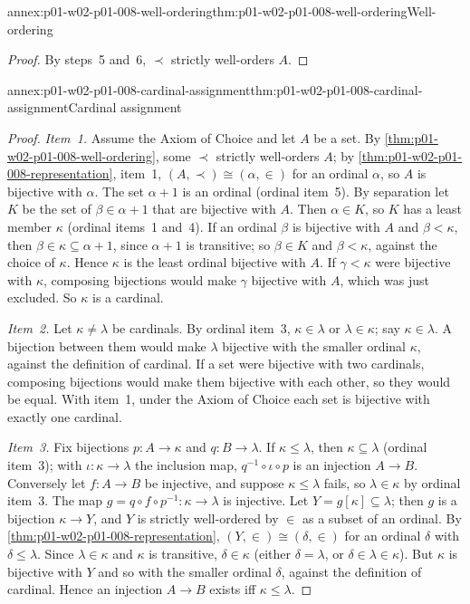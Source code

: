 \begin{annexitem}{annex:p01-w02-p01-008-well-ordering}{thm:p01-w02-p01-008-well-ordering}{Well-ordering}
\begin{proof}
By steps~5 and~6, \(\prec\) strictly well-orders \(A\).
\end{proof}
\end{annexitem}

\begin{annexitem}{annex:p01-w02-p01-008-cardinal-assignment}{thm:p01-w02-p01-008-cardinal-assignment}{Cardinal assignment}
\begin{proof}
\emph{Item~1.} Assume the Axiom of Choice and let \(A\) be a set. By
\cref{thm:p01-w02-p01-008-well-ordering}, some \(\prec\) strictly
well-orders \(A\); by \cref{thm:p01-w02-p01-008-representation}, item~1,
\((A,\prec)\cong(\alpha,\in)\) for an ordinal \(\alpha\), so \(A\) is
bijective with \(\alpha\). The set \(\alpha+1\) is an ordinal (ordinal
item~5). By separation let \(K\) be the set of \(\beta\in\alpha+1\) that are
bijective with \(A\). Then \(\alpha\in K\), so \(K\) has a least member
\(\kappa\) (ordinal items~1 and~4). If an ordinal \(\beta\) is bijective
with \(A\) and \(\beta<\kappa\), then \(\beta\in\kappa\subseteq\alpha+1\),
since \(\alpha+1\) is transitive; so \(\beta\in K\) and \(\beta<\kappa\),
against the choice of \(\kappa\). Hence \(\kappa\) is the least ordinal
bijective with \(A\). If \(\gamma<\kappa\) were bijective with \(\kappa\),
composing bijections would make \(\gamma\) bijective with \(A\), which was
just excluded. So \(\kappa\) is a cardinal.

\emph{Item~2.} Let \(\kappa\neq\lambda\) be cardinals. By ordinal item~3,
\(\kappa\in\lambda\) or \(\lambda\in\kappa\); say \(\kappa\in\lambda\). A
bijection between them would make \(\lambda\) bijective with the smaller
ordinal \(\kappa\), against the definition of cardinal. If a set were
bijective with two cardinals, composing bijections would make them
bijective with each other, so they would be equal. With item~1, under the
Axiom of Choice each set is bijective with exactly one cardinal.

\emph{Item~3.} Fix bijections \(p:A\to\kappa\) and \(q:B\to\lambda\). If
\(\kappa\leq\lambda\), then \(\kappa\subseteq\lambda\) (ordinal item~3); with
\(\iota:\kappa\to\lambda\) the inclusion map, \(q^{-1}\circ\iota\circ p\) is an
injection \(A\to B\). Conversely let
\(f:A\to B\) be injective, and suppose \(\kappa\leq\lambda\) fails, so
\(\lambda\in\kappa\) by ordinal item~3. The map
\(g=q\circ f\circ p^{-1}:\kappa\to\lambda\) is injective. Let
\(Y=g[\kappa]\subseteq\lambda\); then \(g\) is a bijection
\(\kappa\to Y\), and \(Y\) is strictly well-ordered by \(\in\) as a subset of
an ordinal. By \cref{thm:p01-w02-p01-008-representation},
\((Y,\in)\cong(\delta,\in)\) for an ordinal \(\delta\) with
\(\delta\leq\lambda\). Since \(\lambda\in\kappa\) and \(\kappa\) is
transitive, \(\delta\in\kappa\) (either \(\delta=\lambda\), or
\(\delta\in\lambda\in\kappa\)). But \(\kappa\) is bijective with \(Y\) and
so with the smaller ordinal \(\delta\), against the definition of
cardinal. Hence an injection \(A\to B\) exists iff \(\kappa\leq\lambda\).


\end{proof}
\end{annexitem}
